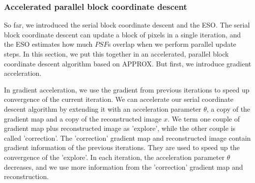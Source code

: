 \subsubsection*{Accelerated parallel block coordinate descent} \label{pcdm:pcdm:approx}
So far, we introduced the serial block coordinate descent and the ESO. The serial block coordinate descent can update a block of pixels in a single iteration, and the ESO estimates how much $PSF$s overlap when we perform parallel update steps. In this section, we put this together in an accelerated, parallel block coordinate descent algorithm based on APPROX\cite{fercoq2015accelerated}. But first, we introduce gradient acceleration.

In gradient acceleration, we use the gradient from previous iterations to speed up convergence of the current iteration. We can accelerate our serial coordinate descent algorithm by extending it with an acceleration parameter $\theta$, a copy of the gradient map and a copy of the reconstructed image $x$.  We term one couple of gradient map plus reconstructed image as 'explore', while the other couple is called 'correction'. The 'correction' gradient map and reconstructed image contain gradient information of the previous iterations. They are used to speed up the convergence of the 'explore'. In each iteration, the acceleration parameter $\theta$ decreases, and we use more information from the 'correction' gradient map and reconstruction.

